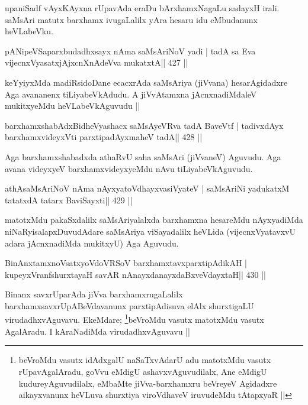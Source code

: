 \begin{artha}
upaniSadf vAyxKAyxna rUpavAda eraDu bArxhamxNagaLu sadayxH irali. saMsAri matutx barxhamx ivugaLalilx yAra hesaru idu eMbudanunx heVLabeVku.
\end{artha}

\begin{shl}
pANipeVSaparxbudadhxsayx nAma saMsAriNoV yadi |
tadA sa Eva vijecnxVyasatxjAjxcnXnAdeVva mukatxtA\hfill || 427 ||
\end{shl}

\begin{artha}
keYyiyxMda madiRsidoDane ecacxrAda saMsAriya (jiVvana) hesarAgidadxre
Aga avananenx tiLiyabeVkAdudu. A jiVvAtamxna jAcnxnadiMdaleV
mukitxyeMdu heVLabeVkAguvudu || 
\end{artha}


\begin{shl}
barxhamxshabAdxBidheVyashacx saMsAyeVRva tadA BaveVtf |
tadivxdAyx barxhamxvideyxVti parxtipadAyxmaheV tadA\hfill || 428 ||
\end{shl}

\begin{artha}
Aga barxhamxshabadxda athaRvU saha saMsAri (jiVvaneV) Aguvudu. Aga avana videyxyeV barxhamxvideyxyeMdu nAvu tiLiyabeVkAguvudu.
\end{artha}

\begin{shl}
athAsaMsAriNoV nAma nAyxyatoV\s dhayxvasiVyateV |
saMsAriNi yadukatxM tatatxdA tatarx BaviSayxti\hfill || 429 ||
\end{shl}

\begin{artha}
matotxMdu pakaSxdalilx saMsAriyalalxda barxhamxna hesareMdu nAyxyadiMda niNaRyisalapxDuvudAdare saMsAriya viSayadalilx heVLida (vijecnxVyatavxvU adara jAcnxnadiMda mukitxyU) Aga Aguvudu.
\end{artha}




\begin{shl}
BinAnxtamxnoVsatxyoVdoVRSoV barxhamxtavxparxtipAdikAH |
kupeyxVranfshurxtayaH savAR nAnayxdanayxdaBxveVdayxtaH\hfill || 430 ||
\end{shl}

\begin{artha}
Binanx savxrUparAda jiVva barxhamxrugaLalilx barxhamxsavxrUpABeVdavanunx
parxtipAdisuva elAlx shurxtigaLU virudadhxvAguvavu. EkeMdare; 
\footnote[1]{beVroMdu vasutx idAdxgalU naSaTxvAdarU adu matotxMdu vasutx
rUpavAgalAradu, goVvu eMdigU ashavxvAguvudilalx, Ane eMdigU
kudureyAguvudilalx, eMbaMte jiVva-barxhamxru beVreyeV Agidadxre
aikayxvanunx heVLuva shurxtiya viroVdhaveV iruvudeMdu tAtapxyaR ||}beVroMdu
vasutx matotxMdu vasutx AgalAradu. I kAraNadiMda virudadhxvAguvavu ||
\end{artha}

